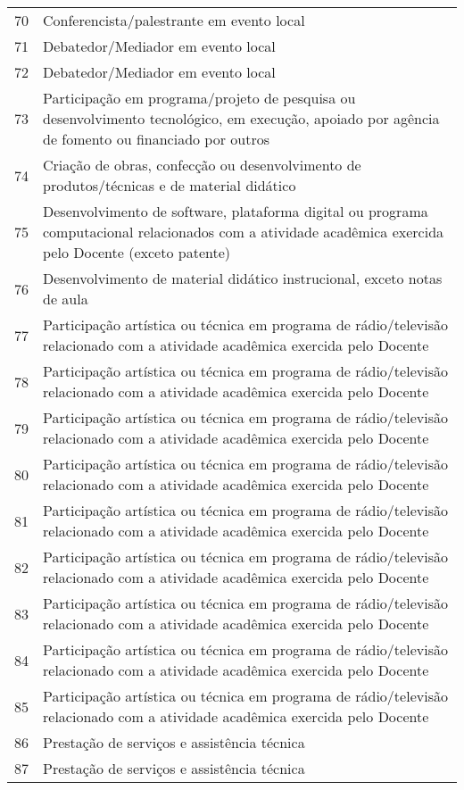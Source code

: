 \documentclass[a4paper,oneside,10pt]{article}
\begin{document}
{\begin{longtable}[H]{@{} r P{8cm} @{}}
70 & {Conferencista/palestrante em evento local}\\
71 & {Debatedor/Mediador em evento local}\\
72 & {Debatedor/Mediador em evento local}\\
73 & {Participação em programa/projeto de pesquisa ou desenvolvimento tecnológico, em execução, apoiado por agência de fomento ou financiado por outros}\\
74 & {Criação de obras, confecção ou desenvolvimento de produtos/técnicas e de material didático}\\
75 & {Desenvolvimento de software, plataforma digital ou programa computacional relacionados com a atividade acadêmica exercida pelo Docente (exceto patente)}\\
76 & {Desenvolvimento de material didático instrucional, exceto notas de aula}\\
77 & {Participação artística ou técnica em programa de rádio/televisão relacionado com a atividade acadêmica exercida pelo Docente}\\
78 & {Participação artística ou técnica em programa de rádio/televisão relacionado com a atividade acadêmica exercida pelo Docente}\\
79 & {Participação artística ou técnica em programa de rádio/televisão relacionado com a atividade acadêmica exercida pelo Docente}\\
80 & {Participação artística ou técnica em programa de rádio/televisão relacionado com a atividade acadêmica exercida pelo Docente}\\
81 & {Participação artística ou técnica em programa de rádio/televisão relacionado com a atividade acadêmica exercida pelo Docente}\\
82 & {Participação artística ou técnica em programa de rádio/televisão relacionado com a atividade acadêmica exercida pelo Docente}\\
83 & {Participação artística ou técnica em programa de rádio/televisão relacionado com a atividade acadêmica exercida pelo Docente}\\
84 & {Participação artística ou técnica em programa de rádio/televisão relacionado com a atividade acadêmica exercida pelo Docente}\\
85 & {Participação artística ou técnica em programa de rádio/televisão relacionado com a atividade acadêmica exercida pelo Docente}\\
86 & {Prestação de serviços e assistência técnica}\\
87 & {Prestação de serviços e assistência técnica}\\

\end{longtable}}
\end{document}
